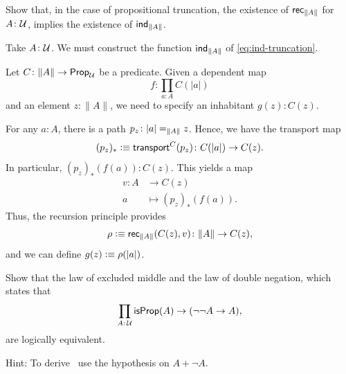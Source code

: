 \begin{exr}
    Show that, in the case of propositional truncation, the existence of\/ $\mathsf{rec}_{\lVert A\rVert}$ for $A\colon\univ$, implies the existence of\/ $\mathsf{ind}_{\lVert A\rVert}$.
\end{exr}

\begin{solution}
    Take $A\colon\univ$. We must construct the function $\mathsf{ind}_{\lVert A\rVert}$ of \eqref{eq:ind-truncation}.

    Let $C\colon\lVert A\rVert\to\fun{Prop}_{\univ}$ be a predicate. Given a dependent map
    \[
        f\colon\prod_{a\colon A}C(\lvert a\rvert)
    \]
    and an element $z\colon\lVert A\rVert$, we need to specify an inhabitant $g(z)\colon C(z)$.

    For any $a\colon A$, there is a path $p_z\colon \lvert a\rvert\eq{\lVert A\rVert}z$. Hence, we have the transport map
    \[
        (p_z)_*\defeq\fun{transport}^C(p_z)\colon C(\lvert a\rvert)\to C(z).
    \]
    In particular, $(p_z)_*(f(a))\colon C(z)$. This yields a map
    \begin{align*}
        v\colon A&\to C(z)\\
        a&\mapsto (p_z)_*(f(a)).
    \end{align*}
    Thus, the recursion principle provides
    \[
        \rho\defeq\fun{rec}_{\lVert A\rVert}(C(z),v)\colon\lVert A\rVert\to C(z),
    \]
    and we can define $g(z)\mathrel{\vcentcolon}\equiv\rho(\lvert a\rvert)$.
    
\end{solution}

\begin{exr}\fe\label{exr:LEM-DNE-equivalence}
    Show that the law of excluded middle\/ {} and the law of double negation, which states that
    \begin{equation}\label{eq:double-negation}
        \prod_{A\colon\univ}\fun{isProp}(A)\to(\neg\neg A\to A),
    \end{equation}
    are logically equivalent.

    {\upshape Hint: To derive \Lem\ use the hypothesis on $A+\neg A$.}
    
\end{exr}

